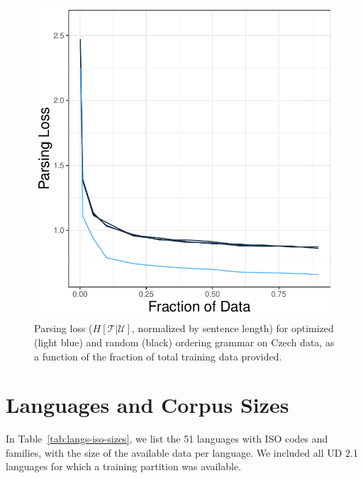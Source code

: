 \documentclass[10pt,twoside,lineno]{article}
\newcommand{\utterance}{\mathcal{U}}
\newcommand{\tree}{\mathcal{T}}
\begin{document}
\begin{figure}[ht]
    \centering
    \includegraphics[scale=.4]{../results/learning-curves/figures/learning-parser-czech-logloss.pdf} 

	\caption{Parsing loss ($H[\tree|\utterance]$, normalized by sentence length) for optimized (light blue) and random (black) ordering grammar on Czech data, as a function of the fraction of total training data provided.}
    \label{fig:learning-czech}
\end{figure}











\section{Languages and Corpus Sizes}
In Table~\ref{tab:langs-iso-sizes}, we list the 51 languages with ISO codes and families, with the size of the available data per language.
We included all UD 2.1 languages for which a training partition was available.
\end{document}
